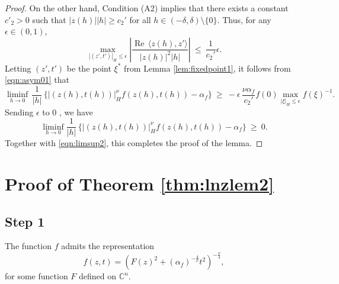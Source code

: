 \documentclass[reqno]{amsart}
\theoremstyle{definition}
\theoremstyle{remark}
\numberwithin{equation}{section}
\begin{document}
\begin{proof}
On the other hand, Condition (A2) implies that there exists a constant $c'_2>0$ such 
that $|z(h)||h|\geq c_2'$ for all $h\in (-\delta,\delta)\setminus \{0\}$. Thus,
for any $\epsilon\in (0,1)$,  
\[
\max_{|(z',t')|_{\! H} \leq \epsilon} \left| \frac {\operatorname{Re}\, 
\langle z(h), z'\rangle}  {|z(h)|^2 |h|} \right| ~\leq~  \frac {1}{c_2'} \epsilon. 
\]
Letting $(z',t')$ be the point $\xi^{\ast}$ from Lemma \ref{lem:fixedpoint1}, it follows from \eqref{eqn:asym01} that
\begin{equation*}
\liminf_{h\to 0}\, \frac {1}{|h|} \, \Big\{ \bigl|(z(h),t(h)) \bigr|_{\! H}^{\nu} f(z(h),t(h)) - \alpha_f \Big\} 
~\geq~ - \epsilon\, \frac {\nu \alpha_f}{c_2'}  f(0) \max_{|\xi|_{\! H} \leq \epsilon} f(\xi)^{-1}.
\end{equation*}
Sending $\epsilon$ to 0 , we have
\begin{equation}
\liminf_{h\to 0}  \frac {1}{|h|} \, \Big\{ \bigl|(z(h),t(h)) \bigr|_{\! H}^{\nu} f(z(h),t(h)) - \alpha_f \Big\}
~\geq~ 0.
\end{equation}
Together with \eqref{eqn:limsup2}, this completes the proof of the lemma.
\end{proof}

\section{Proof of Theorem \ref{thm:lnzlem2}}
\label{sec:PfofLNZ2}

\subsection*{Step 1}
The function $f$ admits the representation
\begin{equation}\label{eqn:oftheform1}
f(z,t) = \left(F(z)^2 + (\alpha_f)^{-\frac{4}{\nu}} t^{2}\right)^{-\frac{\nu}{4}},
\end{equation}
for some function $F$ defined on $\mathbb{C}^n$.
\end{document}
